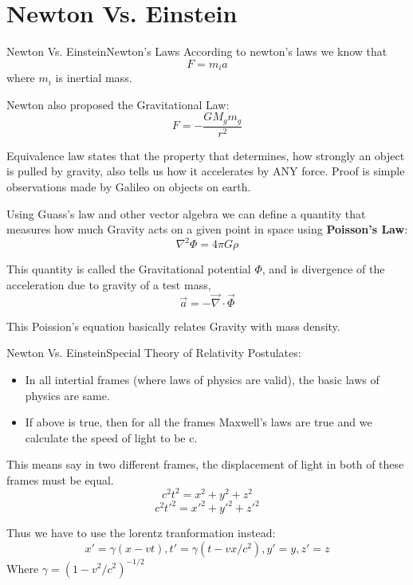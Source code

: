 \section{Newton Vs. Einstein}

\begin{frame}{Newton Vs. Einstein}{Newton's Laws}
	According to newton's laws we know that
	$$ F = m_i a $$
	where $m_i$ is inertial mass.

	Newton also proposed the Gravitational Law:
	$$ F =- \frac{GM_g m_g}{r^2} $$

	Equivalence law states that the property that determines, how strongly
	an object is pulled by gravity, also tells us how it accelerates by ANY
	force. Proof is simple observations made by Galileo on objects on earth.

	Using Guass's law and other vector algebra we can define a quantity that
	measures how much Gravity acts on a given point in space using
	\textbf{Poisson's Law}:
	$$ \nabla^2 \Phi = 4\pi G \rho $$
\end{frame}

\begin{frame}
	This quantity is called the Gravitational potential $\Phi$, and is
	divergence of the acceleration due to gravity of a test mass,
	$$ \vec a = - \vec \nabla \cdot \vec \Phi $$

	This Poission's equation basically relates Gravity with mass density.
\end{frame}


\begin{frame}{Newton Vs. Einstein}{Special Theory of Relativity}
	Postulates:
	\begin{itemize}[<+->]
		\item In all intertial frames (where laws of physics are valid),
			the basic laws of physics are same.
		\item If above is true, then for all the frames Maxwell's laws
			are true and we calculate the speed of light to be c.
        \end{itemize}

	This means say in two different frames, the displacement of light in both
	of these frames must be equal.
	$$ c^2t^2 = x^2 + y^2 + z^2 $$
	$$ c^2t'^2 = x'^2 + y'^2 + z'^2 $$

	Thus we have to use the lorentz tranformation instead:
	$$ x' = \gamma(x - vt), t' = \gamma(t - vx/c^2), y'=y, z'=z $$
	Where $\gamma = (1 - v^2/c^2)^{-1/2}$

\end{frame}

